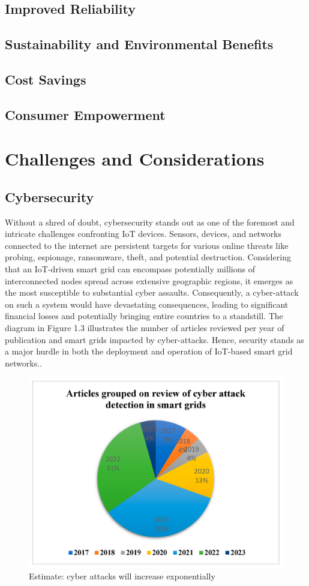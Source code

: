 \subsection{Improved Reliability}
\subsection{Sustainability and Environmental Benefits}
\subsection{Cost Savings}
\subsection{Consumer Empowerment}
\section{Challenges and Considerations }  
\subsection{Cybersecurity}
Without a shred of doubt, cybersecurity stands out as one of the foremost and intricate challenges confronting IoT devices. Sensors, devices, and networks connected to the internet are persistent targets for various online threats like probing, espionage, ransomware, theft, and potential destruction. Considering that an IoT-driven smart grid can encompass potentially millions of interconnected nodes spread across extensive geographic regions, it emerges as the most susceptible to substantial cyber assaults. Consequently, a cyber-attack on such a system would have devastating consequences, leading to significant financial losses and potentially bringing entire countries to a standstill. The diagram in Figure 1.3 illustrates the number of articles reviewed per year of publication and smart grids impacted by cyber-attacks. Hence, security stands as a major hurdle in both the deployment and operation of IoT-based smart grid networks.\cite{kimani2019cyber}.
\begin{figure}[h]
	\centering
	\includegraphics[width=15cm]{figures/attack.png}
	\caption{Estimate: cyber attacks will increase exponentially \cite{mdpi-link}}
\end{figure}

